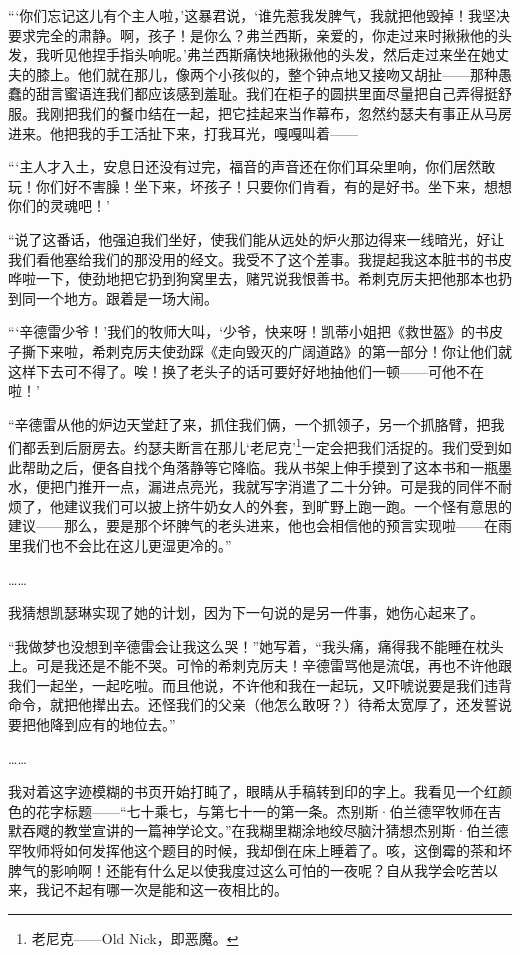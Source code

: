 \par “‘你们忘记这儿有个主人啦，’这暴君说，‘谁先惹我发脾气，我就把他毁掉！我坚决要求完全的肃静。啊，孩子！是你么？弗兰西斯，亲爱的，你走过来时揪揪他的头发，我听见他捏手指头响呢。’弗兰西斯痛快地揪揪他的头发，然后走过来坐在她丈夫的膝上。他们就在那儿，像两个小孩似的，整个钟点地又接吻又胡扯——那种愚蠢的甜言蜜语连我们都应该感到羞耻。我们在柜子的圆拱里面尽量把自己弄得挺舒服。我刚把我们的餐巾结在一起，把它挂起来当作幕布，忽然约瑟夫有事正从马房进来。他把我的手工活扯下来，打我耳光，嘎嘎叫着——
\par “‘主人才入土，安息日还没有过完，福音的声音还在你们耳朵里响，你们居然敢玩！你们好不害臊！坐下来，坏孩子！只要你们肯看，有的是好书。坐下来，想想你们的灵魂吧！’
\par “说了这番话，他强迫我们坐好，使我们能从远处的炉火那边得来一线暗光，好让我们看他塞给我们的那没用的经文。我受不了这个差事。我提起我这本脏书的书皮哗啦一下，使劲地把它扔到狗窝里去，赌咒说我恨善书。希刺克厉夫把他那本也扔到同一个地方。跟着是一场大闹。
\par “‘辛德雷少爷！’我们的牧师大叫，‘少爷，快来呀！凯蒂小姐把《救世盔》的书皮子撕下来啦，希刺克厉夫使劲踩《走向毁灭的广阔道路》的第一部分！你让他们就这样下去可不得了。唉！换了老头子的话可要好好地抽他们一顿——可他不在啦！’
\par “辛德雷从他的炉边天堂赶了来，抓住我们俩，一个抓领子，另一个抓胳臂，把我们都丢到后厨房去。约瑟夫断言在那儿‘老尼克’\footnote{老尼克——Old Nick，即恶魔。}一定会把我们活捉的。我们受到如此帮助之后，便各自找个角落静等它降临。我从书架上伸手摸到了这本书和一瓶墨水，便把门推开一点，漏进点亮光，我就写字消遣了二十分钟。可是我的同伴不耐烦了，他建议我们可以披上挤牛奶女人的外套，到旷野上跑一跑。一个怪有意思的建议——那么，要是那个坏脾气的老头进来，他也会相信他的预言实现啦——在雨里我们也不会比在这儿更湿更冷的。”
\par ……
\par 我猜想凯瑟琳实现了她的计划，因为下一句说的是另一件事，她伤心起来了。
\par “我做梦也没想到辛德雷会让我这么哭！”她写着，“我头痛，痛得我不能睡在枕头上。可是我还是不能不哭。可怜的希刺克厉夫！辛德雷骂他是流氓，再也不许他跟我们一起坐，一起吃啦。而且他说，不许他和我在一起玩，又吓唬说要是我们违背命令，就把他撵出去。还怪我们的父亲（他怎么敢呀？）待希太宽厚了，还发誓说要把他降到应有的地位去。”
\par ……
\par 我对着这字迹模糊的书页开始打盹了，眼睛从手稿转到印的字上。我看见一个红颜色的花字标题——“七十乘七，与第七十一的第一条。杰别斯·伯兰德罕牧师在吉默吞飕的教堂宣讲的一篇神学论文。”在我糊里糊涂地绞尽脑汁猜想杰别斯·伯兰德罕牧师将如何发挥他这个题目的时候，我却倒在床上睡着了。咳，这倒霉的茶和坏脾气的影响啊！还能有什么足以使我度过这么可怕的一夜呢？自从我学会吃苦以来，我记不起有哪一次是能和这一夜相比的。
